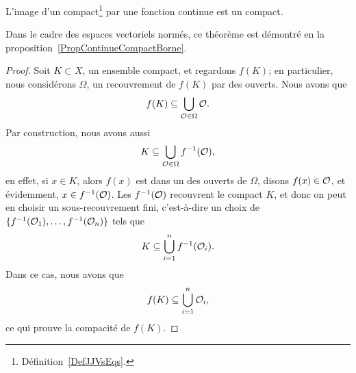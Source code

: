 \begin{theorem}     \label{ThoImCompCotComp}
L'image d'un compact\footnote{Définition~\ref{DefJJVsEqs}.} par une fonction continue est un compact.
\end{theorem}
Dans le cadre des espaces vectoriels normés, ce théorème est démontré en la proposition~\ref{PropContinueCompactBorne}.

\begin{proof}
    Soit $K\subset X$, un ensemble compact, et regardons $f(K)$; en particulier, nous considérons $\Omega$, un recouvrement de $f(K)$ par des ouverts. Nous avons que
    \begin{equation}
        f(K)\subseteq\bigcup_{\mathcal{O}\in\Omega}\mathcal{O}.
    \end{equation}
    Par construction, nous avons aussi
    \begin{equation}
        K\subseteq\bigcup_{\mathcal{O}\in\Omega}f^{-1}(\mathcal{O}),
    \end{equation}
    en effet, si $x\in K$, alors $f(x)$ est dans un des ouverts de $\Omega$, disons $f(x)\in \mathcal{O}$, et évidemment, $x\in f^{-1}(\mathcal{O})$.  Les $f^{-1}(\mathcal{O})$ recouvrent le compact $K$, et donc on peut en choisir un sous-recouvrement fini, c'est-à-dire un choix de $\{ f^{-1}(\mathcal{O}_1),\ldots,f^{-1}(\mathcal{O}_n) \}$ tels que
    \begin{equation}
        K\subseteq \bigcup_{i=1}^nf^{-1}(\mathcal{O}_i).
    \end{equation}
    Dans ce cas, nous avons que
    \begin{equation}
        f(K)\subseteq\bigcup_{i=1}^n\mathcal{O}_i,
    \end{equation}
    ce qui prouve la compacité de $f(K)$.
\end{proof}
